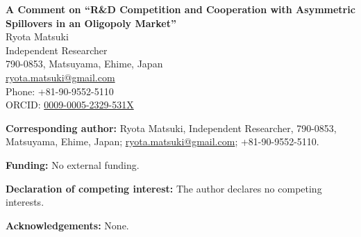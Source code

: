 \documentclass[11pt]{article}
\begin{document}
\begin{center}
{\Large\bfseries A Comment on ``R\&D Competition and Cooperation with Asymmetric Spillovers in an Oligopoly Market''}\\[2em]

{\large Ryota Matsuki}\\[0.75em]
Independent Researcher\\
790-0853, Matsuyama, Ehime, Japan\\
\href{mailto:ryota.matsuki@gmail.com}{ryota.matsuki@gmail.com}\\
Phone: +81-90-9552-5110\\
ORCID: \href{https://orcid.org/0009-0005-2329-531X}{0009-0005-2329-531X}
\end{center}

\bigskip
\noindent\textbf{Corresponding author:} Ryota Matsuki, Independent Researcher, 790-0853, Matsuyama, Ehime, Japan; \href{mailto:ryota.matsuki@gmail.com}{ryota.matsuki@gmail.com}; +81-90-9552-5110.

\medskip
\noindent\textbf{Funding:} No external funding.

\medskip
\noindent\textbf{Declaration of competing interest:} The author declares no competing interests.

\medskip
\noindent\textbf{Acknowledgements:} None.
\end{document}
